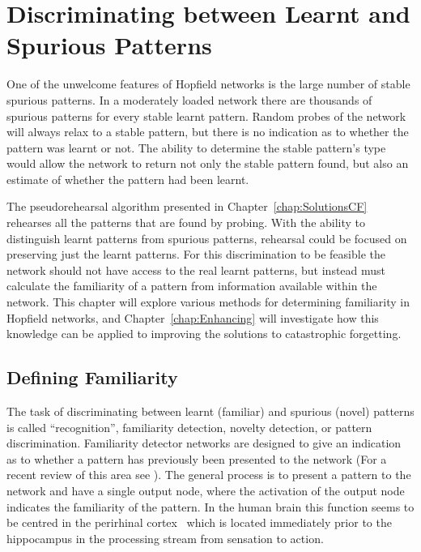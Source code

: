 \chapter{Discriminating between Learnt and Spurious Patterns}
\label{chap:distinguish}

One of the unwelcome features of Hopfield networks is the large number of stable spurious patterns.  In a moderately loaded network there are thousands of spurious patterns for every stable learnt pattern.  Random probes of the network will always relax to a stable pattern, but there is no indication as to whether the pattern was learnt or not.  The ability to determine the stable pattern's type would allow the network to return not only the stable pattern found, but also an estimate of whether the pattern had been learnt. 

The pseudorehearsal algorithm presented in Chapter~\ref{chap:SolutionsCF} rehearses all the patterns that are found by probing.  With the ability to distinguish learnt patterns from spurious patterns, rehearsal could be focused on preserving just the learnt patterns.  For this discrimination to be feasible the network should not have access to the real learnt patterns, but instead must calculate the familiarity of a pattern from information available within the network.  This chapter will explore various methods for determining familiarity in Hopfield networks, and Chapter~\ref{chap:Enhancing} will investigate how this knowledge can be applied to improving the solutions to catastrophic forgetting.  

\section{Defining Familiarity}

The task of discriminating between learnt (familiar) and spurious (novel) patterns is called ``recognition'', familiarity detection, novelty detection, or pattern discrimination.  Familiarity detector networks are designed to give an indication as to whether a pattern has previously been presented to the network (For a recent review of this area see \citet{Markou2003}).  The general process is to present a pattern to the network and have a single output node, where the activation of the output node indicates the familiarity of the pattern.  In the human brain this function seems to be centred in the perirhinal cortex~\citep{Bogacz2001} which is located immediately prior to the hippocampus in the processing stream from sensation to action.

